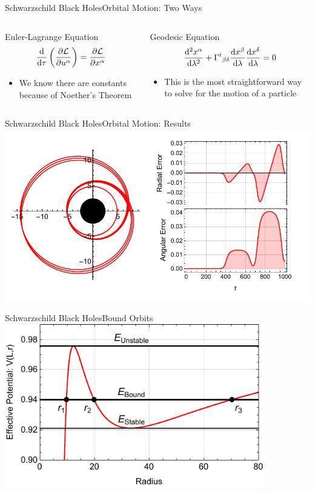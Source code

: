 \documentclass[12pt]{beamer}
\begin{document}
\begin{frame}{Schwarzschild Black Holes}{Orbital Motion: Two Ways}
\begin{columns}[c]
\begin{column}{0.5\textwidth}
\centering
Euler-Lagrange Equation
$$\odv{}{\tau}\left(\pdv{\mathcal{L}}{u^\alpha}\right)=\pdv{\mathcal{L}}{x^\alpha}$$
\begin{itemize}
    \item We know there are constants because of Noether's Theorem
\end{itemize}
\end{column}
\vrule{}
\begin{column}{0.5\textwidth}
\centering
Geodesic Equation
$$\odv[order=2]{x^\alpha}{\lambda} + \Gamma^t{}_{\beta\delta}\odv{x^\beta}{\lambda}\odv{x^\delta}{\lambda}=0$$
\begin{itemize}
    \item This is the most straightforward way to solve for the motion of a particle
\end{itemize}
\end{column}
\end{columns}
\end{frame}

\begin{frame}{Schwarzschild Black Holes}{Orbital Motion: Results}
\centering\includegraphics[width=\textwidth]{MatchedOrbits.pdf}
\end{frame}

\begin{frame}{Schwarzschild Black Holes}{Bound Orbits}
\centering\includegraphics[width=0.85\textwidth]{RadialPotentialPE.pdf}
\end{frame}
\end{document}
